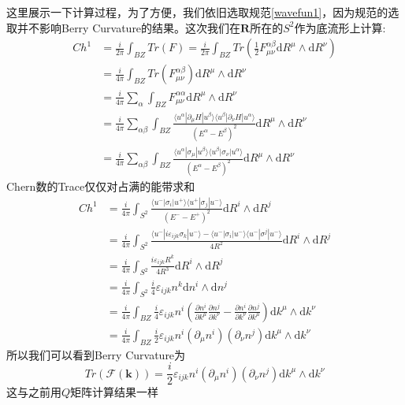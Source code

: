 \documentclass{article}
\numberwithin{equation}{subsection}
\begin{document}
这里展示一下计算过程，为了方便，我们依旧选取规范\eqref{wavefun1}，因为规范的选取并不影响Berry Curvature的结果。这次我们在$\mathbf{R}$所在的$S^2$作为底流形上计算:
\begin{equation}
    \begin{split}
        Ch^1&=\frac{i}{2\pi}\int_{BZ}Tr(F)=\frac{i}{2\pi}\int_{BZ}Tr(\frac{1}{2}F_{\mu\nu}^{\alpha\beta}\mathrm{d}R^\mu\wedge\mathrm{d}R^{\nu})\\
        &=\frac{i}{4\pi}\int_{BZ}Tr(F_{\mu\nu}^{\alpha\beta})\mathrm{d}R^\mu\wedge\mathrm{d}R^\nu\\
        &=\frac{i}{4\pi}\sum_{\alpha}\int_{BZ}F_{\mu\nu}^{\alpha\alpha}\mathrm{d}R^\mu\wedge\mathrm{d}R^\nu\\
        &=\frac{i}{4\pi}\sum_{\alpha\beta}\int_{BZ}\frac{\langle u^\alpha|\partial_\mu H|u^\beta\rangle\langle u^\beta|\partial_\nu H|u^\alpha\rangle}{(E^\alpha-E^\beta)^2}\mathrm{d}R^\mu\wedge\mathrm{d}R^\nu\\
        &=\frac{i}{4\pi}\sum_{\alpha\beta}\int_{BZ}\frac{\langle u^\alpha|\sigma_\mu|u^\beta\rangle\langle u^\beta|\sigma_\nu|u^\alpha\rangle}{(E^\alpha-E^\beta)^2}\mathrm{d}R^\mu\wedge\mathrm{d}R^\nu
    \end{split}
\end{equation}
Chern数的Trace仅仅对占满的能带求和
\begin{equation}
    \begin{split}
        Ch^1&=\frac{i}{4\pi}\int_{S^2}\frac{\langle u^-|\sigma_i|u^+\rangle\langle u^+|\sigma_j|u^-\rangle}{(E^--E^+)^2}\mathrm{d}R^i\wedge\mathrm{d}R^j\\
        &=\frac{i}{4\pi}\int_{S^2}\frac{\langle u^-|i\varepsilon_{ijk}\sigma_k|u^-\rangle-\langle u^-|\sigma_i|u^-\rangle\langle u^-|\sigma^j|u^-\rangle}{4R^2}\mathrm{d}R^i\wedge\mathrm{d}R^j\\
        &=\frac{i}{4\pi}\int_{S^2}\frac{i\varepsilon_{ijk}R^k}{4R^3}\mathrm{d}R^i\wedge\mathrm{d}R^j\\
        &=\frac{i}{4\pi}\int_{S^2}\frac{i}{4}\varepsilon_{ijk}n^k\mathrm{d}n^i\wedge\mathrm{d}n^j\\
        &=\frac{i}{4\pi}\int_{BZ}\frac{i}{4}\varepsilon_{ijk}n^i(\frac{\partial n^i}{\partial k^\mu}\frac{\partial n^j}{\partial k^\nu}-\frac{\partial n^i}{\partial k^\nu}\frac{\partial n^j}{\partial k^\mu})\mathrm{d}k^\mu\wedge\mathrm{d}k^\nu\\
        &=\frac{i}{4\pi}\int_{BZ}\frac{i}{2}\varepsilon_{ijk}n^i(\partial_\mu n^i)(\partial_\nu n^j)\mathrm{d}k^\mu\wedge\mathrm{d}k^\nu
    \end{split}
\end{equation}
所以我们可以看到Berry Curvature为
\begin{equation}
    Tr(\mathcal{F}(\mathbf{k}))=\frac{i}{2}\varepsilon_{ijk}n^i(\partial_\mu n^i)(\partial_\nu n^j)\mathrm{d}k^\mu\wedge\mathrm{d}k^\nu
\end{equation}
这与之前用$Q$矩阵计算结果一样
\end{document}
